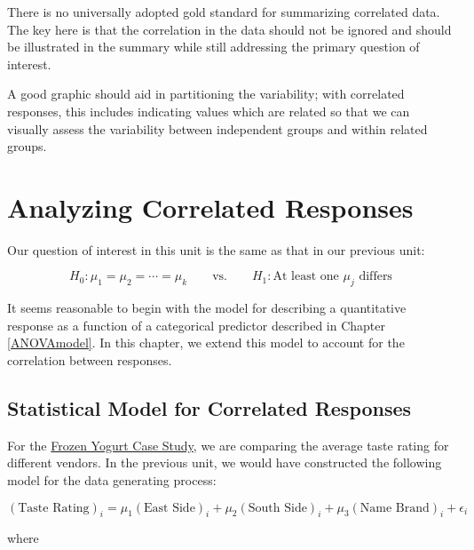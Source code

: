 \documentclass[
]{book}
\theoremstyle{plain}
\theoremstyle{mydefn}
\theoremstyle{myexmpl}
\theoremstyle{remark}
\begin{document}
There is no universally adopted gold standard for summarizing correlated data. The key here is that the correlation in the data should not be ignored and should be illustrated in the summary while still addressing the primary question of interest.

\begin{rmdkeyidea}
A good graphic should aid in partitioning the variability; with correlated responses, this includes indicating values which are related so that we can visually assess the variability between independent groups and within related groups.
\end{rmdkeyidea}

\hypertarget{Blockmodel}{%
\chapter{Analyzing Correlated Responses}\label{Blockmodel}}

Our question of interest in this unit is the same as that in our previous unit:

\[H_0: \mu_1 = \mu_2 = \dotsb = \mu_k \qquad \text{vs.} \qquad H_1: \text{At least one } \mu_j \text{ differs}\]

It seems reasonable to begin with the model for describing a quantitative response as a function of a categorical predictor described in Chapter \ref{ANOVAmodel}. In this chapter, we extend this model to account for the correlation between responses.

\hypertarget{statistical-model-for-correlated-responses}{%
\section{Statistical Model for Correlated Responses}\label{statistical-model-for-correlated-responses}}

For the \protect\hyperlink{CaseYogurt}{Frozen Yogurt Case Study}, we are comparing the average taste rating for different vendors. In the previous unit, we would have constructed the following model for the data generating process:

\[(\text{Taste Rating})_i = \mu_1 (\text{East Side})_i + \mu_2 (\text{South Side})_i + \mu_3 (\text{Name Brand})_i + \epsilon_i\]

where
\end{document}

